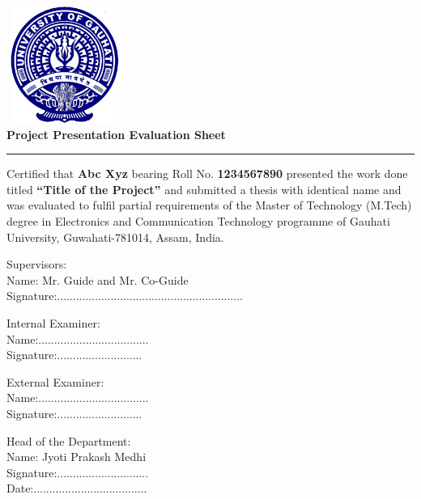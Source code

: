 
\begin{center}
\includegraphics[width=1.5in,height=1.5in]{clogoe.eps} \\
{\bf \large Project Presentation Evaluation Sheet}
\end{center}
\rule{\linewidth}{2mm} \pagestyle{empty} \vspace{0.25in}
\par
Certified that \textbf{Abc Xyz} bearing Roll No. \textbf{1234567890} presented the work done titled {\bf ``Title of the Project''} and submitted a thesis with identical name and was evaluated to fulfil partial requirements of the Master of Technology (M.Tech) degree in Electronics and Communication Technology programme of Gauhati University, Guwahati-781014, Assam, India.\\
\begin{multicols}{2}
\begin{flushleft}

\noindent Supervisors:\\
Name: Mr. Guide and Mr. Co-Guide\\
Signature:...........................................................\\

\vspace*{2mm}

\noindent Internal Examiner:\\
Name:...................................\\
Signature:...........................\\

\vspace*{2mm}

\noindent External Examiner:\\
Name:...................................\\
Signature:...........................\\


\end{flushleft}

\vspace*{30mm}



\begin{flushright}

Head of the Department:\\
Name: Jyoti Prakash Medhi\\
Signature:.............................\\
Date:....................................\\

\vspace*{30mm}
\end{flushright}
\end{multicols}
